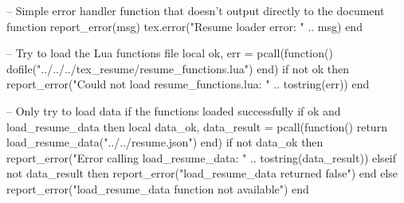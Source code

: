 %

\usepackage{luacode}

\begin{luacode*}
-- Simple error handler function that doesn't output directly to the document
function report_error(msg)
  tex.error("Resume loader error: " .. msg)
end

-- Try to load the Lua functions file
local ok, err = pcall(function() dofile("../../../tex_resume/resume_functions.lua") end)
if not ok then
  report_error("Could not load resume_functions.lua: " .. tostring(err))
end

-- Only try to load data if the functions loaded successfully
if ok and load_resume_data then
  local data_ok, data_result = pcall(function() return load_resume_data("../../resume.json") end)
  if not data_ok then
    report_error("Error calling load_resume_data: " .. tostring(data_result))
  elseif not data_result then
    report_error("load_resume_data returned false")
  end
else
  report_error("load_resume_data function not available")
end
\end{luacode*}

\newcommand{\ResumeBasicsFirstname}{\directlua{get_value("basics", "first_name")}}

\newcommand{\ResumeBasicsLastname}{\directlua{get_value("name", "last_name")}}
